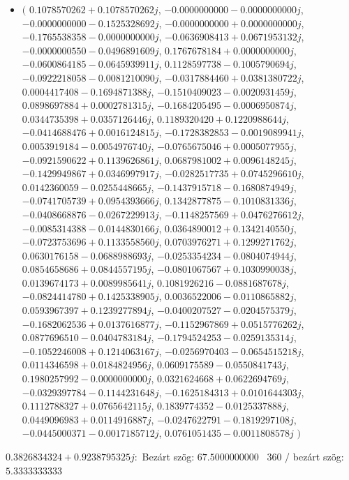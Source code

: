 \documentclass[14pt,a4paper]{article}
\begin{document}
\begin{itemize}
\item
$\big($
$0.1078570262+0.1078570262j$, $-0.0000000000-0.0000000000j$, $-0.0000000000-0.1525328692j$, $-0.0000000000+0.0000000000j$, $-0.1765538358-0.0000000000j$, $-0.0636908413+0.0671953132j$, $-0.0000000550-0.0496891609j$, $0.1767678184+0.0000000000j$, $-0.0600864185-0.0645939911j$, $0.1128597738-0.1005790694j$, $-0.0922218058-0.0081210090j$, $-0.0317884460+0.0381380722j$, $0.0004417408-0.1694871388j$, $-0.1510409023-0.0020931459j$, $0.0898697884+0.0002781315j$, $-0.1684205495-0.0006950874j$, $0.0344735398+0.0357126446j$, $0.1189320420+0.1220988644j$, $-0.0414688476+0.0016124815j$, $-0.1728382853-0.0019089941j$, $0.0053919184-0.0054976740j$, $-0.0765675046+0.0005077955j$, $-0.0921590622+0.1139626861j$, $0.0687981002+0.0096148245j$, $-0.1429949867+0.0346997917j$, $-0.0282517735+0.0745296610j$, $0.0142360059-0.0255448665j$, $-0.1437915718-0.1680874949j$, $-0.0741705739+0.0954393666j$, $0.1342877875-0.1010831336j$, $-0.0408668876-0.0267229913j$, $-0.1148257569+0.0476276612j$, $-0.0085314388-0.0144830166j$, $0.0364890012+0.1342140550j$, $-0.0723753696+0.1133558560j$, $0.0703976271+0.1299271762j$, $0.0630176158-0.0688988693j$, $-0.0253354234-0.0804074944j$, $0.0854658686+0.0844557195j$, $-0.0801067567+0.1030990038j$, $0.0139674173+0.0089985641j$, $0.1081926216-0.0881687678j$, $-0.0824414780+0.1425338905j$, $0.0036522006-0.0110865882j$, $0.0593967397+0.1239277894j$, $-0.0400207527-0.0204575379j$, $-0.1682062536+0.0137616877j$, $-0.1152967869+0.0515776262j$, $0.0877696510-0.0404783184j$, $-0.1794524253-0.0259135314j$, $-0.1052246008+0.1214063167j$, $-0.0256970403-0.0654515218j$, $0.0114346598+0.0184824956j$, $0.0609175589-0.0550841743j$, $0.1980257992-0.0000000000j$, $0.0321624668+0.0622694769j$, $-0.0329397784-0.1144231648j$, $-0.1625184313+0.0101644303j$, $0.1112788327+0.0765642115j$, $0.1839774352-0.0125337888j$, $0.0449096983+0.0114916887j$, $-0.0247622791-0.1819297108j$, $-0.0445000371-0.0017185712j$, $0.0761051435-0.0011808578j$
$\big)$
\end{itemize}
$0.3826834324+0.9238795325j$:\
Bezárt szög: $67.5000000000$ \
360 / bezárt szög: $5.3333333333$\
\end{document}
